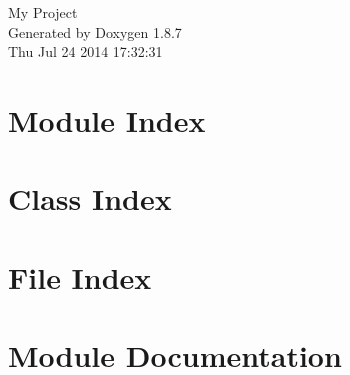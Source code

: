 \documentclass[twoside]{book}
\newcommand{\+}{\discretionary{\mbox{\scriptsize$\hookleftarrow$}}{}{}}
\newcommand{\clearemptydoublepage}{%
  \newpage{\pagestyle{empty}\cleardoublepage}%
}
\begin{document}
\hypersetup{pageanchor=false,
             bookmarks=true,
             bookmarksnumbered=true,
             pdfencoding=unicode
            }
\begin{titlepage}
\vspace*{7cm}
\begin{center}%
{\Large My Project }\\
\vspace*{1cm}
{\large Generated by Doxygen 1.8.7}\\
\vspace*{0.5cm}
{\small Thu Jul 24 2014 17:32:31}\\
\end{center}
\end{titlepage}
\clearemptydoublepage
\tableofcontents
\clearemptydoublepage
{}
\hypersetup{pageanchor=true}

\chapter{Module Index}

\chapter{Class Index}

\chapter{File Index}

\chapter{Module Documentation}



























\end{document}
